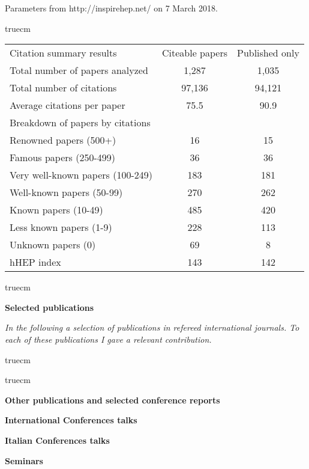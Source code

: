 \documentclass[11pt,twoside,a4paper]{article}
\begin{document}
Parameters from http://inspirehep.net/ on 7 March 2018.

 truecm

\begin{tabular}{lcc}
Citation summary results &	Citeable papers	& Published only \\
Total number of papers analyzed  &	1,287 &	1,035 \\
Total number of citations  &	97,136 &	94,121 \\
Average citations per paper  &	75.5 &	90.9 \\
Breakdown of papers by citations  & & \\ 
Renowned papers (500+) &	16 &	15 \\
Famous papers (250-499) &	36 &	36 \\
Very well-known papers (100-249) &	183 &	181 \\
Well-known papers (50-99) &	270 &	262 \\
Known papers (10-49) &	485 &	420 \\
Less known papers (1-9) &	228 &	113 \\
Unknown papers (0) &	69 &	8 \\
hHEP index &	143 &	142 \\
\end{tabular}

 truecm

\begin{center}
  {\bf Selected publications}
\end{center}

{\it In the following a selection of publications in refereed
  international journals. To each of these publications I gave a
  relevant contribution.}

 truecm

\begin{thebibliography}{99999}
  

 truecm

  
  \begin{center}
    {\bf Other publications and selected conference reports }
    \\
  \end{center}
  

  \newpage

  \begin{center}
    {\bf International Conferences talks}
    \\
  \end{center}
  

  \begin{center}
    {\bf Italian Conferences talks}
    \\
  \end{center}
  
  
  \begin{center}
    {\bf Seminars}
    \\
  \end{center}
  

\end{thebibliography}
\end{document}

